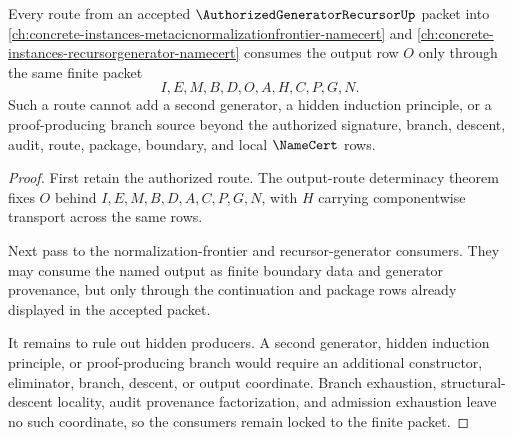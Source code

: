 \begin{theorem}
\label{thm:authorized-generator-recursor-normalization-frontier-consumer-lock}
Every route from an accepted $\AuthorizedGeneratorRecursorUp$ packet into \autoref{ch:concrete-instances-metacicnormalizationfrontier-namecert} and \autoref{ch:concrete-instances-recursorgenerator-namecert} consumes the output row $O$ only through the same finite packet
$$
I,E,M,B,D,O,A,H,C,P,G,N.
$$
Such a route cannot add a second generator, a hidden induction principle, or a proof-producing branch source beyond the authorized signature, branch, descent, audit, route, package, boundary, and local $\NameCert$ rows.
\end{theorem}
\begin{proof}
First retain the authorized route. The output-route determinacy theorem fixes $O$ behind $I,E,M,B,D,A,C,P,G,N$, with $H$ carrying componentwise transport across the same rows.

Next pass to the normalization-frontier and recursor-generator consumers. They may consume the named output as finite boundary data and generator provenance, but only through the continuation and package rows already displayed in the accepted packet.

It remains to rule out hidden producers. A second generator, hidden induction principle, or proof-producing branch would require an additional constructor, eliminator, branch, descent, or output coordinate. Branch exhaustion, structural-descent locality, audit provenance factorization, and admission exhaustion leave no such coordinate, so the consumers remain locked to the finite packet.
\end{proof}

